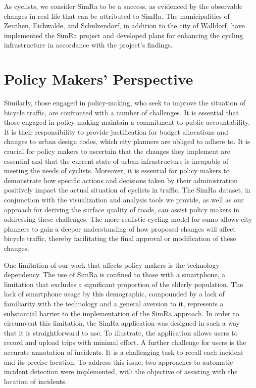 As cyclists, we consider SimRa to be a success, as evidenced by the observable changes in real life that can be attributed to SimRa.
The municipalities of Zeuthen, Eichwalde, and Schulzendorf, in addition to the city of Walldorf, have implemented the SimRa project and developed plans for enhancing the cycling infrastructure in accordance with the project's findings.

\section*{Policy Makers' Perspective} 
Similarly, those engaged in policy-making, who seek to improve the situation of bicycle traffic, are confronted with a number of challenges.
It is essential that those engaged in policy-making maintain a commitment to public accountability.
It is their responsibility to provide justification for budget allocations and changes to urban design codes, which city planners are obliged to adhere to.
It is crucial for policy makers to ascertain that the changes they implement are essential and that the current state of urban infrastructure is incapable of meeting the needs of cyclists.
Moreover, it is essential for policy makers to demonstrate how specific actions and decisions taken by their administration positively impact the actual situation of cyclists in traffic.
The SimRa dataset, in conjunction with the visualization and analysis tools we provide, as well as our approach for deriving the surface quality of roads, can assist policy makers in addressing these challenges.
The more realistic cycling model for \ac{sumo} allows city planners to gain a deeper understanding of how proposed changes will affect bicycle traffic, thereby facilitating the final approval or modification of these changes.

One limitation of our work that affects policy makers is the technology dependency.
The use of SimRa is confined to those with a smartphone, a limitation that excludes a significant proportion of the elderly population. The lack of smartphone usage by this demographic, compounded by a lack of familiarity with the technology and a general aversion to it, represents a substantial barrier to the implementation of the SimRa approach.
In order to circumvent this limitation, the SimRa application was designed in such a way that it is straightforward to use.
To illustrate, the application allows users to record and upload trips with minimal effort.
A further challenge for users is the accurate annotation of incidents.
It is a challenging task to recall each incident and its precise location.
To address this issue, two approaches to automatic incident detection were implemented, with the objective of assisting with the location of incidents.

